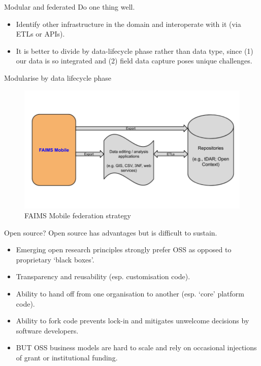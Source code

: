 \documentclass[aspectratio=169, 12pt]{beamer} %
\begin{document}
\begin{frame}{Modular and federated}
  Do one thing well.
      \begin{itemize}[label=\textbullet]
        \item Identify other infrastructure in the domain and interoperate with it (via ETLs or APIs).
        \item It is better to divide by data-lifecycle phase rather than data type, since (1) our data is so integrated and (2) field data capture poses unique challenges.
    \end{itemize}
\end{frame}

\begin{frame}{Modularise by data lifecycle phase}
 \begin{figure}[H]
    \centering
        \includegraphics[height=.75\textheight]{figures/FAIMS-federation.png}
        \caption{FAIMS Mobile federation strategy}
        \label{fig:figure13}
 \end{figure}
\end{frame}

\begin{frame}{Open source?}
  Open source has advantages but is difficult to sustain.
      \begin{itemize}[label=\textbullet]
        \item Emerging open research principles strongly prefer OSS as opposed to proprietary ‘black boxes’.
        \item Transparency and reusability (esp. customisation code).
        \item Ability to hand off from one organisation to another (esp. `core' platform code).
        \item Ability to fork code prevents lock-in and mitigates unwelcome decisions by software developers.
        \item BUT OSS business models are hard to scale and rely on occasional injections of grant or institutional funding.
    \end{itemize}
\end{frame}
\end{document}
